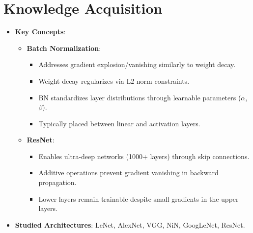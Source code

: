 \documentclass[conference]{IEEEtran}
\begin{document}
\section{Knowledge Acquisition}
\begin{itemize}[leftmargin=*,noitemsep]
    \item \textbf{Key Concepts}:
    \begin{itemize}[leftmargin=*]
        \item \textbf{Batch Normalization}:
        \begin{itemize}[leftmargin=*]
            \item Addresses gradient explosion/vanishing similarly to weight decay.
            \item Weight decay regularizes via L2-norm constraints.
            \item BN standardizes layer distributions through learnable parameters ($\alpha$, $\beta$).
            \item Typically placed between linear and activation layers.
        \end{itemize}
        \item \textbf{ResNet}:
        \begin{itemize}[leftmargin=*]
            \item Enables ultra-deep networks (1000+ layers) through skip connections.
            \item Additive operations prevent gradient vanishing in backward propagation.
            \item Lower layers remain trainable despite small gradients in the upper layers.
        \end{itemize}
    \end{itemize}
    \item \textbf{Studied Architectures}: LeNet, AlexNet, VGG, NiN, GoogLeNet, ResNet.
\end{itemize}
\end{document}
